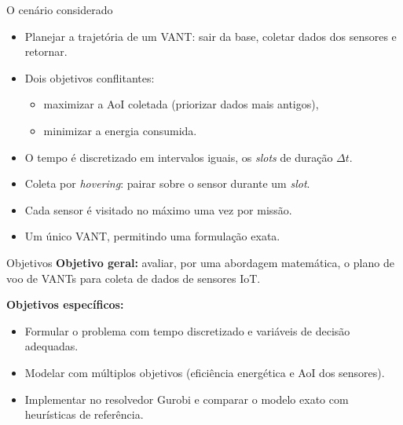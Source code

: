 \documentclass[aspectratio=169,11pt]{beamer}
\begin{document}
\begin{frame}{O cenário considerado}
  \begin{itemize}
    \item Planejar a trajetória de um VANT: sair da base, coletar dados dos sensores e retornar.
    \item Dois objetivos conflitantes:
      \begin{itemize}
        \item maximizar a AoI coletada (priorizar dados mais antigos),
        \item minimizar a energia consumida.
      \end{itemize}
    \item O tempo é discretizado em intervalos iguais, os \emph{slots} de duração $\Delta t$.
    \item Coleta por \emph{hovering}: pairar sobre o sensor durante um \emph{slot}.
    \item Cada sensor é visitado no máximo uma vez por missão.
    \item Um único VANT, permitindo uma formulação exata.
  \end{itemize}
\end{frame}

\begin{frame}{Objetivos}
  \textbf{Objetivo geral:} avaliar, por uma abordagem matemática, o plano de voo de VANTs para coleta de dados de sensores IoT.

  \vspace{1em}
  \textbf{Objetivos específicos:}
  \begin{itemize}
    \item Formular o problema com tempo discretizado e variáveis de decisão adequadas.
    \item Modelar com múltiplos objetivos (eficiência energética e AoI dos sensores).
    \item Implementar no resolvedor Gurobi e comparar o modelo exato com heurísticas de referência.
  \end{itemize}
\end{frame}
\end{document}
